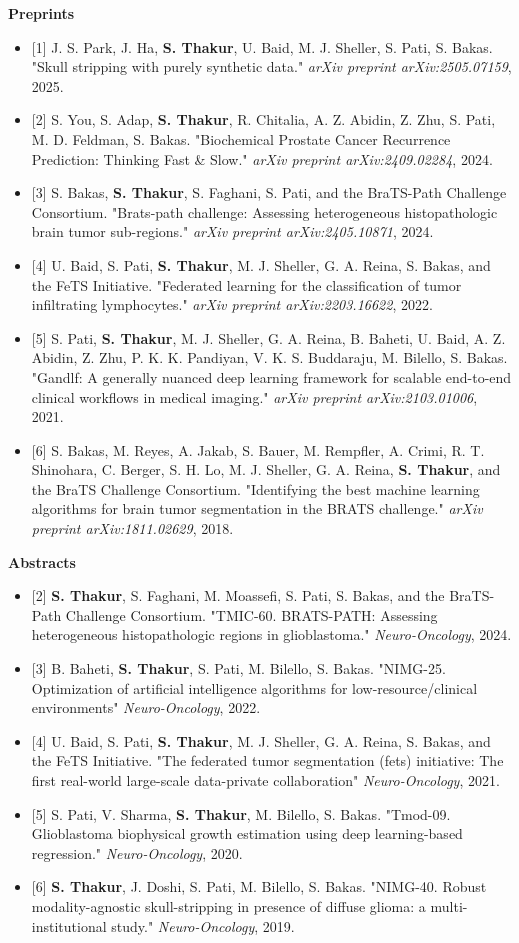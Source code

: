 \documentclass[letterpaper,11pt]{article}
\newcommand{\resumeItem}[1]{
  \item\small{
    {#1 \vspace{-2pt}}
  }
}
\newcommand{\resumeItemListStart}{\begin{itemize}}
\newcommand{\resumeItemListEnd}{\end{itemize}\vspace{-5pt}}
\begin{document}
    \item\small{\textbf{Preprints}}
      \resumeItemListStart
        \resumeItem{[1] J. S. Park, J. Ha, \textbf{S. Thakur}, U. Baid, M. J. Sheller, S. Pati, S. Bakas. "Skull stripping with purely synthetic data." \textit{arXiv preprint arXiv:2505.07159}, 2025.}
        \resumeItem{[2] S. You, S. Adap, \textbf{S. Thakur}, R. Chitalia, A. Z. Abidin, Z. Zhu, S. Pati, M. D. Feldman, S. Bakas. "Biochemical Prostate Cancer Recurrence Prediction: Thinking Fast \& Slow." \textit{arXiv preprint arXiv:2409.02284}, 2024.}
        \resumeItem{[3] S. Bakas, \textbf{S. Thakur}, S. Faghani, S. Pati, and the BraTS-Path Challenge Consortium. "Brats-path challenge: Assessing heterogeneous histopathologic brain tumor sub-regions." \textit{arXiv preprint arXiv:2405.10871}, 2024.}
        \resumeItem{[4] U. Baid, S. Pati, \textbf{S. Thakur}, M. J. Sheller, G. A. Reina, S. Bakas, and the FeTS Initiative. "Federated learning for the classification of tumor infiltrating lymphocytes." \textit{arXiv preprint arXiv:2203.16622}, 2022.}
        \resumeItem{[5] S. Pati, \textbf{S. Thakur}, M. J. Sheller, G. A. Reina, B. Baheti, U. Baid, A. Z. Abidin, Z. Zhu, P. K. K. Pandiyan, V. K. S. Buddaraju, M. Bilello, S. Bakas. "Gandlf: A generally nuanced deep learning framework for scalable end-to-end clinical workflows in medical imaging." \textit{arXiv preprint arXiv:2103.01006}, 2021.}
        \resumeItem{[6] S. Bakas, M. Reyes, A. Jakab, S. Bauer, M. Rempfler, A. Crimi, R. T. Shinohara, C. Berger, S. H. Lo, M. J. Sheller, G. A. Reina, \textbf{S. Thakur}, and the BraTS Challenge Consortium. "Identifying the best machine learning algorithms for brain tumor segmentation in the BRATS challenge." \textit{arXiv preprint arXiv:1811.02629}, 2018.}
      \resumeItemListEnd

    \item\small{\textbf{Abstracts}}
      \resumeItemListStart
        \resumeItem{[2] \textbf{S. Thakur}, S. Faghani, M. Moassefi, S. Pati, S. Bakas, and the BraTS-Path Challenge Consortium. "TMIC-60. BRATS-PATH: Assessing heterogeneous histopathologic regions in glioblastoma." \textit{Neuro-Oncology}, 2024.}
        \resumeItem{[3] B. Baheti, \textbf{S. Thakur}, S. Pati, M. Bilello, S. Bakas. "NIMG-25. Optimization of artificial intelligence algorithms for low-resource/clinical environments" \textit{Neuro-Oncology}, 2022.}
        \resumeItem{[4] U. Baid, S. Pati, \textbf{S. Thakur}, M. J. Sheller, G. A. Reina, S. Bakas, and the FeTS Initiative. "The federated tumor segmentation (fets) initiative: The first real-world large-scale data-private collaboration" \textit{Neuro-Oncology}, 2021.}
        \resumeItem{[5] S. Pati, V. Sharma, \textbf{S. Thakur}, M. Bilello, S. Bakas. "Tmod-09. Glioblastoma biophysical growth estimation using deep learning-based regression." \textit{Neuro-Oncology}, 2020.}
        \resumeItem{[6] \textbf{S. Thakur}, J. Doshi, S. Pati, M. Bilello, S. Bakas. "NIMG-40. Robust modality-agnostic skull-stripping in presence of diffuse glioma: a multi-institutional study." \textit{Neuro-Oncology}, 2019.}
      \resumeItemListEnd
\end{document}
